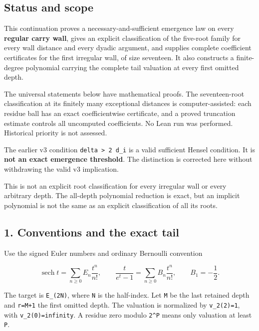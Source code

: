 \documentclass[11pt,letterpaper]{article}
\begin{document}
\subsection{Status and scope}\label{status-and-scope}

This continuation proves a necessary-and-sufficient emergence law on every \textbf{regular carry wall}, gives an explicit classification of the five-root family for every wall distance and every dyadic argument, and supplies complete coefficient certificates for the first irregular wall, of size seventeen. It also constructs a finite-degree polynomial carrying the complete tail valuation at every first omitted depth.

The universal statements below have mathematical proofs. The seventeen-root classification at its finitely many exceptional distances is computer-assisted: each residue ball has an exact coefficientwise certificate, and a proved truncation estimate controls all uncomputed coefficients. No Lean run was performed. Historical priority is not assessed.

The earlier v3 condition \texttt{delta\ \textgreater{}\ 2\ d\_i} is a valid sufficient Hensel condition. It is \textbf{not an exact emergence threshold}. The distinction is corrected here without withdrawing the valid v3 implication.

This is not an explicit root classification for every irregular wall or every arbitrary depth. The all-depth polynomial reduction is exact, but an implicit polynomial is not the same as an explicit classification of all its roots.

\subsection{1. Conventions and the exact tail}\label{conventions-and-the-exact-tail}

Use the signed Euler numbers and ordinary Bernoulli convention

\[
\operatorname{sech}t=\sum_{n\ge0}E_n\frac{t^n}{n!},\qquad
\frac{t}{e^t-1}=\sum_{n\ge0}B_n\frac{t^n}{n!},\qquad B_1=-\frac12.
\]

The target is \texttt{E\_(2N)}, where \texttt{N} is the half-index. Let \texttt{M} be the last retained depth and \texttt{r=M+1} the first omitted depth. The valuation is normalized by \texttt{v\_2(2)=1}, with \texttt{v\_2(0)=infinity}. A residue zero modulo \texttt{2\^{}P} means only valuation at least \texttt{P}.
\end{document}
